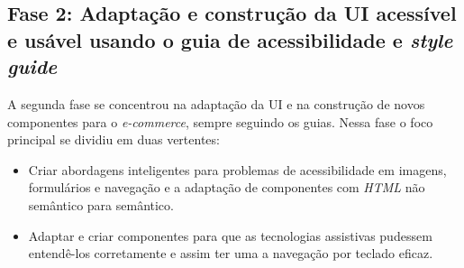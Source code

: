 \subsection{Fase 2: Adaptação e construção da UI acessível e usável usando o guia de acessibilidade e \textit{style guide}}
{A segunda fase se concentrou na adaptação da UI e na construção de novos componentes para o \textit{e-commerce}, sempre seguindo os guias. Nessa fase o foco principal se dividiu em duas vertentes:
\begin{itemize}
\item Criar abordagens inteligentes para problemas de acessibilidade em imagens, formulários e navegação e a adaptação de componentes com \textit{HTML} \cite{HTML} não semântico para semântico.
\item  Adaptar e criar componentes para que as tecnologias assistivas pudessem entendê-los corretamente e assim ter uma a navegação por teclado eficaz.

\end{itemize}
}
